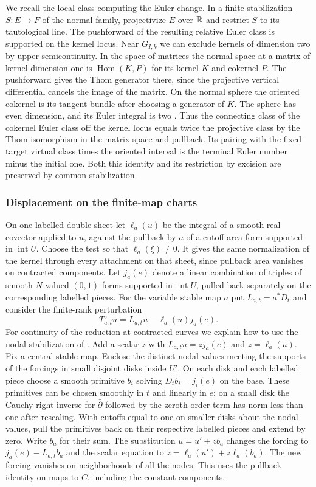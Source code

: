 We recall the local class computing the Euler change. In a finite
stabilization $S:E\to F$ of the normal family, projectivize $E$
over $\mathbb R$ and restrict $S$ to its tautological line. The pushforward
of the resulting relative Euler class is supported on the kernel
locus. Near $G_{I,k}$ we can exclude kernels of dimension two by
upper semicontinuity. In the space of matrices the normal space at a
matrix of kernel dimension one is $\operatorname{Hom}(K,P)$ for
its kernel $K$ and cokernel $P$. The pushforward gives the Thom
generator there, since the projective vertical differential cancels
the image of the matrix. On the normal sphere the oriented cokernel
is its tangent bundle after choosing a generator of $K$. The sphere
has even dimension, and its Euler integral is two
\cite[Lemma~6.10]{bai}. Thus the connecting class of the cokernel
Euler class off the kernel locus equals twice the projective class
by the Thom isomorphism in the matrix space and pullback. Its pairing
with the fixed-target virtual class times the oriented interval is
the terminal Euler number minus the initial one. Both this identity
and its restriction by excision are preserved by common stabilization.

\subsubsection{Displacement on the finite-map charts}
On one labelled double sheet let $\ell_a(u)$ be the integral of a
smooth real covector applied to $u$, against the pullback by $a$ of a
cutoff area form supported in $\operatorname{int}U$. Choose the test
so that $\ell_a(\xi)\ne0$. It gives the same normalization of the
kernel through every attachment on that sheet, since pullback area
vanishes on contracted components. Let $j_a(e)$ denote a linear
combination of triples of smooth $N$-valued $(0,1)$-forms supported
in $\operatorname{int}U$, pulled back separately on the corresponding
labelled pieces. For the variable stable map $a$ put $L_{a,t}=a^*D_t$
and consider the finite-rank perturbation
\begin{equation}\label{p10-eq:desc-perturb}
 T^e_{a,t}u=L_{a,t}u-\ell_a(u)j_a(e).
\end{equation}
For continuity of the reduction at contracted curves we explain how
to use the nodal stabilization of \cite[Appendix~B]{bai}. Add a
scalar $z$ with $L_{a,t}u=zj_a(e)$ and $z=\ell_a(u)$. Fix a central
stable map. Enclose the distinct nodal values meeting the supports of
the forcings in small disjoint disks inside $U'$. On each disk and
each labelled piece choose a smooth primitive $b_i$ solving
$D_t b_i=j_i(e)$ on the base. These primitives can be chosen
smoothly in $t$ and linearly in $e$: on a small disk the Cauchy
right inverse for $\bar\partial$ followed by the zeroth-order term
has norm less than one after rescaling. With cutoffs equal to one on
smaller disks about the nodal values, pull the primitives back on
their respective labelled pieces and extend by zero. Write $b_a$ for
their sum. The substitution $u=u'+zb_a$ changes the forcing to
$j_a(e)-L_{a,t}b_a$ and the scalar equation to
$z=\ell_a(u')+z\ell_a(b_a)$. The new forcing vanishes on
neighborhoods of all the nodes. This uses the pullback identity on
maps to $C$, including the constant components.

